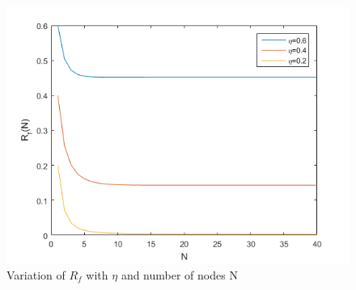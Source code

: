  \begin{figure}[!ht]
\includegraphics{./pics/computation_complexity.png}
\caption{Variation of $R_f$ with $\eta$ and number of nodes N \cite{cordella1999performance}}
\label{fig:compl}
\end{figure}

%


